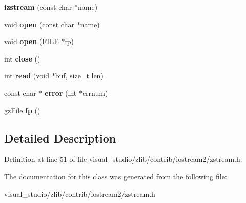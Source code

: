 \begin{DoxyCompactItemize}
{\bfseries izstream} (const char $\ast$name)
\item 
\mbox{\label{classizstream_a3e0af69bbc4704daa637850817b77098}} 
void {\bfseries open} (const char $\ast$name)
\item 
\mbox{\label{classizstream_a1ddcaff781f58a08576f0935be5ccd3c}} 
void {\bfseries open} (F\+I\+LE $\ast$fp)
\item 
\mbox{\label{classizstream_ac2a7342deb79761277e846c8b24ef92a}} 
int {\bfseries close} ()
\item 
\mbox{\label{classizstream_a6e280a19c4a745ab4acc9615788ffa95}} 
int {\bfseries read} (void $\ast$buf, size\+\_\+t len)
\item 
\mbox{\label{classizstream_a19ca9a17f897366d081aae3950f7946e}} 
const char $\ast$ {\bfseries error} (int $\ast$errnum)
\item 
\mbox{\label{classizstream_a0438da66cc9cdb1a2a7ab4872a909fbf}} 
\hyperlink{structgz_file__s}{gz\+File} {\bfseries fp} ()
\end{DoxyCompactItemize}


\subsection{Detailed Description}


Definition at line \hyperlink{visual__studio_2zlib_2contrib_2iostream2_2zstream_8h_source_l00051}{51} of file \hyperlink{visual__studio_2zlib_2contrib_2iostream2_2zstream_8h_source}{visual\+\_\+studio/zlib/contrib/iostream2/zstream.\+h}.



The documentation for this class was generated from the following file\+:\begin{DoxyCompactItemize}
\item 
visual\+\_\+studio/zlib/contrib/iostream2/zstream.\+h\end{DoxyCompactItemize}
